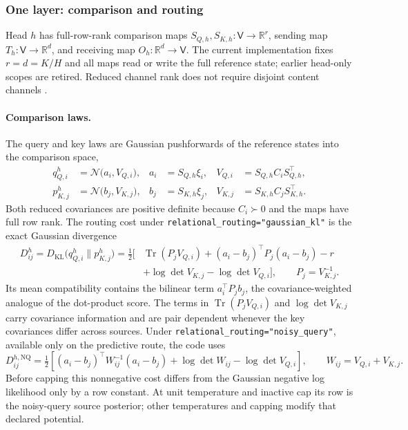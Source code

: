 \documentclass[11pt]{article}
\theoremstyle{definition}
\theoremstyle{remark}
\providecommand{\cfg}[1]{{\small\texttt{#1}}}
\providecommand{\KL}{D_{\mathrm{KL}}}
\providecommand{\Tr}{\operatorname{Tr}}
\providecommand{\N}{\mathcal{N}}
\begin{document}
\subsubsection{One layer: comparison and routing}
\label{inference:p:sec:routing}

Head $h$ has full-row-rank comparison maps $S_{Q,h},S_{K,h}:\mathsf V\to\mathbb R^r$, sending map $T_h:\mathsf V\to\mathbb R^d$, and receiving map $O_h:\mathbb R^d\to\mathsf V$. The current implementation fixes $r=d=K/H$ and all maps read or write the full reference state; earlier head-only scopes are retired. Reduced channel rank does not require disjoint content channels \citep{links:vaswani2017}.

\paragraph{Comparison laws.}
The query and key laws are Gaussian pushforwards of the reference states into the comparison space,
\begin{equation}
\begin{aligned}
q_{Q,i}^{h}&=\N\bigl(a_i,V_{Q,i}\bigr),&a_i&=S_{Q,h}\xi_i,&V_{Q,i}&=S_{Q,h}C_iS_{Q,h}^{\top},\\
p_{K,j}^{h}&=\N\bigl(b_j,V_{K,j}\bigr),&b_j&=S_{K,h}\xi_j,&V_{K,j}&=S_{K,h}C_jS_{K,h}^{\top}.
\end{aligned}
\label{inference:p:eq:comparison_laws}
\end{equation}
Both reduced covariances are positive definite because $C_i\succ0$ and the maps have full row rank. The routing cost under \cfg{relational\_routing="gaussian\_kl"} is the exact Gaussian divergence
\begin{equation}
\begin{aligned}
D_{ij}^{h}=\KL\bigl(q_{Q,i}^{h}\|p_{K,j}^{h}\bigr)
=\tfrac12\bigl[&\Tr(P_jV_{Q,i})+(a_i-b_j)^{\top}P_j(a_i-b_j)-r\\
&+\log\det V_{K,j}-\log\det V_{Q,i}\bigr],
\qquad P_j=V_{K,j}^{-1}.
\end{aligned}
\label{inference:p:eq:routing_cost}
\end{equation}
Its mean compatibility contains the bilinear term $a_i^{\top}P_jb_j$, the covariance-weighted analogue of the dot-product score. The terms in $\Tr(P_jV_{Q,i})$ and $\log\det V_{K,j}$ carry covariance information and are pair dependent whenever the key covariances differ across sources. Under \cfg{relational\_routing="noisy\_query"}, available only on the predictive route, the code uses
\begin{equation}
D_{ij}^{h,\mathrm{NQ}}=\tfrac12[(a_i-b_j)^\top W_{ij}^{-1}(a_i-b_j)+\log\det W_{ij}-\log\det V_{Q,i}],\qquad W_{ij}=V_{Q,i}+V_{K,j}.
\label{inference:p:eq:noisy_query}
\end{equation}
Before capping this nonnegative cost differs from the Gaussian negative log likelihood only by a row constant. At unit temperature and inactive cap its row is the noisy-query source posterior; other temperatures and capping modify that declared potential.
\end{document}
